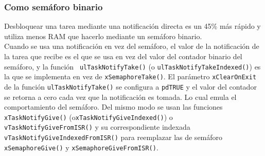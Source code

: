 \subsubsection{Como semáforo binario}

Desbloquear una tarea mediante una notificación directa es un 45\% más rápido y utiliza menos RAM que hacerlo mediante un semáforo binario. \\

Cuando se usa una notificación en vez del semáforo, el valor de la notificación de la tarea que recibe es el que se usa en vez del valor del contador binario del semáforo, y la función \texttt{ ulTaskNotifyTake()} (o \texttt{ulTaskNotifyTakeIndexed()}) es la que se implementa en vez de \texttt{xSemaphoreTake()}. El parámetro \texttt{xClearOnExit} de la función \texttt{ulTaskNotifyTake()} se configura a \texttt{pdTRUE} y el valor del contador se retorna a cero cada vez que la notificación es tomada. Lo cual emula el comportamiento del semáforo. Del mismo modo se usan las funciones \texttt{xTaskNotifyGive()} (o\texttt{xTaskNotifyGiveIndexed()}) o \texttt{vTaskNotifyGiveFromISR()} y su correspondiente indexada \texttt{vTaskNotifyGiveIndexedFromISR()} para reemplazar las de semáforo \texttt{xSemaphoreGive()} y \texttt{xSemaphoreGiveFromISR()}.

